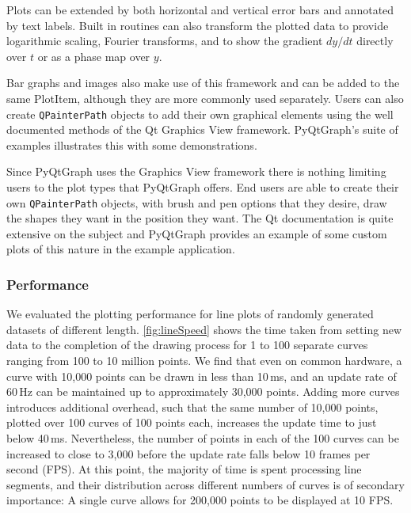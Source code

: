 \documentclass[journal]{vgtc}                %
\begin{document}
Plots can be extended by both horizontal and vertical error bars and annotated by text labels. Built in routines can also transform the plotted data to provide logarithmic scaling, Fourier transforms, and to show the gradient $dy/dt$ directly over $t$ or as a phase map over $y$.

Bar graphs and images also make use of this framework and can be added to the same PlotItem, although they are more commonly used separately. \color{DarkOrchid} Users can also create \texttt{QPainterPath} objects to add their own graphical elements using the well documented methods of the Qt Graphics View framework. PyQtGraph's suite of examples\cite{pg_examples} illustrates this with some demonstrations.

\color{brown}
Since PyQtGraph uses the Graphics View framework there is nothing limiting users to the plot types that PyQtGraph offers.  End users are able to create their own \texttt{QPainterPath} objects, with brush and pen options that they desire, draw the shapes they want in the position they want.  The Qt documentation is quite extensive on the subject and PyQtGraph provides an example of some custom plots of this nature in the example application.
\color{black}

\subsubsection{Performance}

\color{DarkOrchid}
We evaluated the plotting performance for line plots of randomly generated datasets of different length. \autoref{fig:lineSpeed} shows the time taken from setting new data to the completion of the drawing process for 1 to 100 separate curves ranging from 100 to 10 million points. We find that even on common hardware, a curve with 10,000 points can be drawn in less than 10\,ms, and an update rate of 60\,Hz can be maintained up to approximately 30,000 points. Adding more curves introduces additional overhead, such that the same number of 10,000 points, plotted over 100 curves of 100 points each, increases the update time to just below 40\,ms. Nevertheless, the number of points in each of the 100 curves can be increased to close to 3,000 before the update rate falls below 10 frames per second (FPS). At this point, the majority of time is spent processing line segments, and their distribution across different numbers of curves is of secondary importance: A single curve allows for 200,000 points to be displayed at 10 FPS. 
\end{document}
